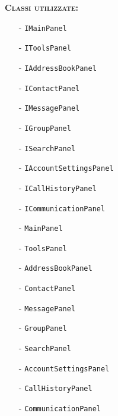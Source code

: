 \begin{description}
	\item{\scshape\bfseries Classi utilizzate:} 
	\begin{itemize}[noitemsep,nolistsep]
		\item[-] \texttt{IMainPanel}
		\item[-] \texttt{IToolsPanel}
		\item[-] \texttt{IAddressBookPanel}
		\item[-] \texttt{IContactPanel}
		\item[-] \texttt{IMessagePanel}
		\item[-] \texttt{IGroupPanel}
		\item[-] \texttt{ISearchPanel}
		\item[-] \texttt{IAccountSettingsPanel}
		\item[-] \texttt{ICallHistoryPanel}
		\item[-] \texttt{ICommunicationPanel}
		\item[-] \texttt{MainPanel}
		\item[-] \texttt{ToolsPanel}
		\item[-] \texttt{AddressBookPanel}
		\item[-] \texttt{ContactPanel}
		\item[-] \texttt{MessagePanel}
		\item[-] \texttt{GroupPanel}
		\item[-] \texttt{SearchPanel}
		\item[-] \texttt{AccountSettingsPanel}
		\item[-] \texttt{CallHistoryPanel}
		\item[-] \texttt{CommunicationPanel}
	\end{itemize}  
\end{description}

